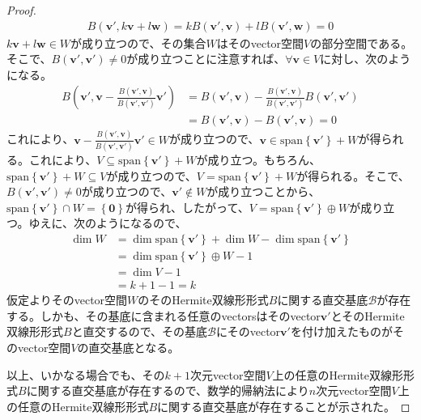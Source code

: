 \documentclass[dvipdfmx]{jsarticle}
\begin{document}
\begin{proof}
\begin{align*}
B\left( \mathbf{v}',k\mathbf{v} + l\mathbf{w} \right) = kB\left( \mathbf{v}',\mathbf{v} \right) + lB\left( \mathbf{v}',\mathbf{w} \right) = 0
\end{align*}
$k\mathbf{v} + l\mathbf{w} \in W$が成り立つので、その集合$W$はそのvector空間$V$の部分空間である。そこで、$B\left( \mathbf{v}',\mathbf{v}' \right) \neq 0$が成り立つことに注意すれば、$\forall\mathbf{v} \in V$に対し、次のようになる。
\begin{align*}
B\left( \mathbf{v}',\mathbf{v} - \frac{B\left( \mathbf{v}',\mathbf{v} \right)}{B\left( \mathbf{v}',\mathbf{v}' \right)}\mathbf{v}' \right) &= B\left( \mathbf{v}',\mathbf{v} \right) - \frac{B\left( \mathbf{v}',\mathbf{v} \right)}{B\left( \mathbf{v}',\mathbf{v}' \right)}B\left( \mathbf{v}',\mathbf{v}' \right)\\
&= B\left( \mathbf{v}',\mathbf{v} \right) - B\left( \mathbf{v}',\mathbf{v} \right) = 0
\end{align*}
これにより、$\mathbf{v} - \frac{B\left( \mathbf{v}',\mathbf{v} \right)}{B\left( \mathbf{v}',\mathbf{v}' \right)}\mathbf{v}' \in W$が成り立つので、$\mathbf{v} \in {\mathrm{span}}\left\{ \mathbf{v}' \right\} + W$が得られる。これにより、$V \subseteq {\mathrm{span}}\left\{ \mathbf{v}' \right\} + W$が成り立つ。もちろん、${\mathrm{span}}\left\{ \mathbf{v}' \right\} + W \subseteq V$が成り立つので、$V = {\mathrm{span}}\left\{ \mathbf{v}' \right\} + W$が得られる。そこで、$B\left( \mathbf{v}',\mathbf{v}' \right) \neq 0$が成り立つので、$\mathbf{v}' \notin W$が成り立つことから、${\mathrm{span}}\left\{ \mathbf{v}' \right\} \cap W = \left\{ \mathbf{0} \right\}$が得られ、したがって、$V = {\mathrm{span}}\left\{ \mathbf{v}' \right\} \oplus W$が成り立つ。ゆえに、次のようになるので、
\begin{align*}
\dim W &= \dim{{\mathrm{span}}\left\{ \mathbf{v}' \right\}} + \dim W - \dim{{\mathrm{span}}\left\{ \mathbf{v}' \right\}}\\
&= \dim{{\mathrm{span}}\left\{ \mathbf{v}' \right\} \oplus W} - 1\\
&= \dim V - 1\\
&= k + 1 - 1 = k
\end{align*}
仮定よりそのvector空間$W$のそのHermite双線形形式$B$に関する直交基底$\mathcal{B}$が存在する。しかも、その基底に含まれる任意のvectorsはそのvector$\mathbf{v}'$とそのHermite双線形形式$B$と直交するので、その基底$\mathcal{B}$にそのvector$\mathbf{v}'$を付け加えたものがそのvector空間$V$の直交基底となる。\par
以上、いかなる場合でも、その$k + 1$次元vector空間$V$上の任意のHermite双線形形式$B$に関する直交基底が存在するので、数学的帰納法により$n$次元vector空間$V$上の任意のHermite双線形形式$B$に関する直交基底が存在することが示された。
\end{proof}
\end{document}
